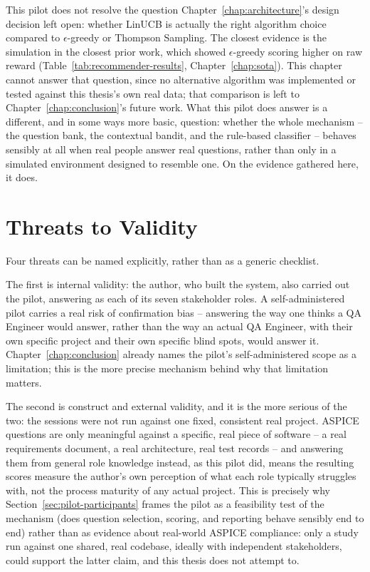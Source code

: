 \documentclass[a4paper, 12pt, oneside, openany, BCOR1cm,toc=chapterentrywithdots]{scrbook}
\begin{document}
This pilot does not resolve the question Chapter~\ref{chap:architecture}'s design decision left
open: whether LinUCB is actually the right algorithm choice compared to $\epsilon$-greedy or
Thompson Sampling. The closest evidence is the simulation in the closest prior work, which
showed $\epsilon$-greedy scoring higher on raw reward (Table~\ref{tab:recommender-results},
Chapter~\ref{chap:sota}). This chapter cannot answer that question, since no alternative
algorithm was implemented or tested against this thesis's own real data; that comparison is left
to Chapter~\ref{chap:conclusion}'s future work. What this pilot does answer is a different, and
in some ways more basic, question: whether the whole mechanism -- the question bank, the
contextual bandit, and the rule-based classifier -- behaves sensibly at all when real people
answer real questions, rather than only in a simulated environment designed to resemble one. On
the evidence gathered here, it does.

\section{Threats to Validity}
\label{sec:threats-to-validity}

Four threats can be named explicitly, rather than as a generic checklist.

The first is internal validity: the author, who built the system, also carried out the pilot,
answering as each of its seven stakeholder roles. A self-administered pilot carries a real risk
of confirmation bias
-- answering the way one thinks a QA Engineer would answer, rather than the way an actual QA
Engineer, with their own specific project and their own specific blind spots, would answer it.
Chapter~\ref{chap:conclusion} already names the pilot's self-administered scope as a limitation;
this is the more precise mechanism behind why that limitation matters.

The second is construct and external validity, and it is the more serious of the two: the
sessions were not run against one fixed, consistent real project. ASPICE questions are only
meaningful against a specific, real piece of software -- a real requirements document, a real
architecture, real test records -- and answering them from general role knowledge instead, as
this pilot did, means the resulting scores measure the author's own perception of what each role
typically struggles with, not the process maturity of any actual project. This is precisely why
Section~\ref{sec:pilot-participants} frames the pilot as a feasibility test of the mechanism
(does question selection, scoring, and reporting behave sensibly end to end) rather than as
evidence about real-world ASPICE compliance: only a study run against one shared, real codebase,
ideally with independent stakeholders, could support the latter claim, and this thesis does not
attempt to.
\end{document}
